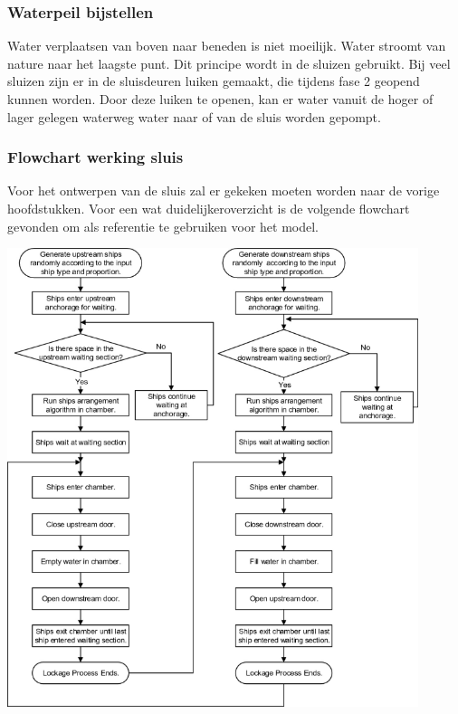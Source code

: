 \documentclass{article} %
\begin{document}
\subsubsection{Waterpeil bijstellen}
Water verplaatsen van boven naar beneden is niet moeilijk. Water stroomt van nature naar het laagste punt. Dit principe wordt in de sluizen gebruikt. Bij veel sluizen zijn er in de sluisdeuren luiken gemaakt, die tijdens fase 2 geopend kunnen worden. Door deze luiken te openen, kan er water vanuit de hoger of lager gelegen waterweg water naar of van de sluis worden gepompt. \par

\newpage
\subsubsection{Flowchart werking sluis}
Voor het ontwerpen van de sluis zal er gekeken moeten worden naar de vorige hoofdstukken. Voor een wat duidelijkeroverzicht is de volgende flowchart gevonden om als referentie te gebruiken voor het model. \par
\includegraphics[width=0.9\textwidth]{lockageprocess.png} \\ \cite{flowchart1}
\newpage
\end{document}

